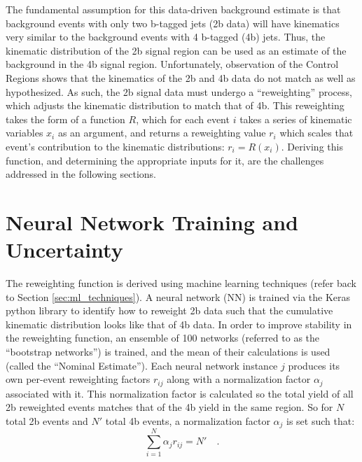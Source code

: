     The fundamental assumption for this data-driven background estimate
        is that background events with only two b-tagged jets (2b data)
        will have kinematics very similar to the background events with 4 b-tagged (4b) jets.
    Thus, the kinematic distribution of the 2b signal region can be used as an estimate of the background in the 4b signal region.
    Unfortunately, observation of the Control Regions shows that the kinematics of the 2b and 4b data do not match as well as hypothesized.
    As such, the 2b signal data must undergo a ``reweighting'' process,
        which adjusts the kinematic distribution to match that of 4b.
    This reweighting takes the form of a function $R$,
        which for each event $i$ takes a series of kinematic variables $x_i$ as an argument,
        and returns a reweighting value $r_i$ which scales that event's contribution to the kinematic distributions:
        $r_i = R(x_i)$.
    Deriving this function, and determining the appropriate inputs for it,
        are the challenges addressed in the following sections.

\FloatBarrier
\section{Neural Network Training and Uncertainty} \label{sec:nn_training}

    The reweighting function is derived using machine learning techniques (refer back to Section \ref{sec:ml_techniques}).
    A neural network (NN) is trained via the Keras python library\cite{keras} to identify how to reweight 2b data
        such that the cumulative kinematic distribution looks like that of 4b data.
    In order to improve stability in the reweighting function,
        an ensemble of 100 networks (referred to as the ``bootstrap networks'') is trained,
        and the mean of their calculations is used (called the ``Nominal Estimate'').
    Each neural network instance $j$ produces its own per-event reweighting factors $r_{ij}$
        along with a normalization factor $\alpha_j$ associated with it.
    This normalization factor is calculated so the total yield of all 2b reweighted events matches that of the 4b yield in the same region. 
    So for $N$ total 2b events and $N'$ total 4b events, a normalization factor $\alpha_j$ is set such that:
        \begin{equation}
            \sum_{i=1}^{N} \alpha_j r_{ij} = N'
            \quad.
        \end{equation}

